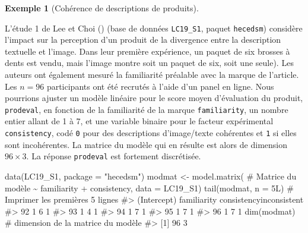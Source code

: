 \documentclass[
  11pt,
  letterpaper,
]{scrbook}
\newenvironment{Shaded}{\begin{snugshade}}{\end{snugshade}}
\newcommand{\AttributeTok}[1]{\textcolor[rgb]{0.40,0.45,0.13}{#1}}
\newcommand{\CommentTok}[1]{\textcolor[rgb]{0.37,0.37,0.37}{#1}}
\newcommand{\DecValTok}[1]{\textcolor[rgb]{0.68,0.00,0.00}{#1}}
\newcommand{\FunctionTok}[1]{\textcolor[rgb]{0.28,0.35,0.67}{#1}}
\newcommand{\NormalTok}[1]{\textcolor[rgb]{0.00,0.23,0.31}{#1}}
\newcommand{\OtherTok}[1]{\textcolor[rgb]{0.00,0.23,0.31}{#1}}
\newcommand{\SpecialCharTok}[1]{\textcolor[rgb]{0.37,0.37,0.37}{#1}}
\newcommand{\StringTok}[1]{\textcolor[rgb]{0.13,0.47,0.30}{#1}}
\theoremstyle{plain}
\theoremstyle{plain}
\theoremstyle{definition}
\newtheorem{example}{Exemple}[chapter]
\theoremstyle{definition}
\theoremstyle{remark}
\begin{document}
\begin{example}[Cohérence de descriptions de
produits]\protect\hypertarget{exm-lee-choi1}{}\label{exm-lee-choi1}

L'étude 1 de Lee et Choi () (base de
données \texttt{LC19\_S1}, paquet \texttt{hecedsm}) considère l'impact
sur la perception d'un produit de la divergence entre la description
textuelle et l'image. Dans leur première expérience, un paquet de six
brosses à dents est vendu, mais l'image montre soit un paquet de six,
soit une seule). Les auteurs ont également mesuré la familiarité
préalable avec la marque de l'article. Les \(n=96\) participants ont été
recrutés à l'aide d'un panel en ligne. Nous pourrions ajuster un modèle
linéaire pour le score moyen d'évaluation du produit, \texttt{prodeval},
en fonction de la familiarité de la marque \texttt{familiarity}, un
nombre entier allant de 1 à 7, et une variable binaire pour le facteur
expérimental \texttt{consistency}, codé \texttt{0} pour des descriptions
d'image/texte cohérentes et \texttt{1} si elles sont incohérentes. La
matrice du modèle qui en résulte est alors de dimension \(96\times 3.\)
La réponse \texttt{prodeval} est fortement discrétisée.

\begin{Shaded}
\begin{Highlighting}[]
\FunctionTok{data}\NormalTok{(LC19\_S1, }\AttributeTok{package =} \StringTok{"hecedsm"}\NormalTok{)}
\NormalTok{modmat }\OtherTok{\textless{}{-}} \FunctionTok{model.matrix}\NormalTok{( }\CommentTok{\# Matrice du modèle}
     \SpecialCharTok{\textasciitilde{}}\NormalTok{ familiarity }\SpecialCharTok{+}\NormalTok{ consistency,}
     \AttributeTok{data =}\NormalTok{ LC19\_S1)}
\FunctionTok{tail}\NormalTok{(modmat, }\AttributeTok{n =} \DecValTok{5}\NormalTok{L) }\CommentTok{\# Imprimer les premières 5 lignes}
\CommentTok{\#\textgreater{}    (Intercept) familiarity consistencyinconsistent}
\CommentTok{\#\textgreater{} 92           1           6                       1}
\CommentTok{\#\textgreater{} 93           1           4                       1}
\CommentTok{\#\textgreater{} 94           1           7                       1}
\CommentTok{\#\textgreater{} 95           1           7                       1}
\CommentTok{\#\textgreater{} 96           1           7                       1}
\FunctionTok{dim}\NormalTok{(modmat) }\CommentTok{\# dimension de la matrice du modèle}
\CommentTok{\#\textgreater{} [1] 96  3}
\end{Highlighting}
\end{Shaded}

\end{example}
\end{document}
